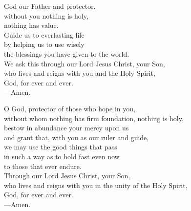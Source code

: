 \prayer


\begin{prayerverse}
God our Father and protector,\\
without you nothing is holy,\\
nothing has value.\\
Guide us to everlasting life\\
by helping us to use wisely\\
the blessings you have given to the world.\\
We ask this through our Lord Jesus Christ, your Son,\\
who lives and reigns with you and the Holy Spirit,\\
God, for ever and ever.\\
{\color{red}---\thinspace}Amen.
\end{prayerverse}


\begin{prayerverse}
O God, protector of those who hope in you,\\
without whom nothing has firm foundation, nothing is holy,\\
bestow in abundance your mercy upon us\\
and grant that, with you as our ruler and guide,\\
we may use the good things that pass\\
in such a way as to hold fast even now\\
to those that ever endure.\\
Through our Lord Jesus Christ, your Son,\\
who lives and reigns with you in the unity of the Holy Spirit,\\
God, for ever and ever.\\
{\color{red}---\thinspace}Amen.
\end{prayerverse}

